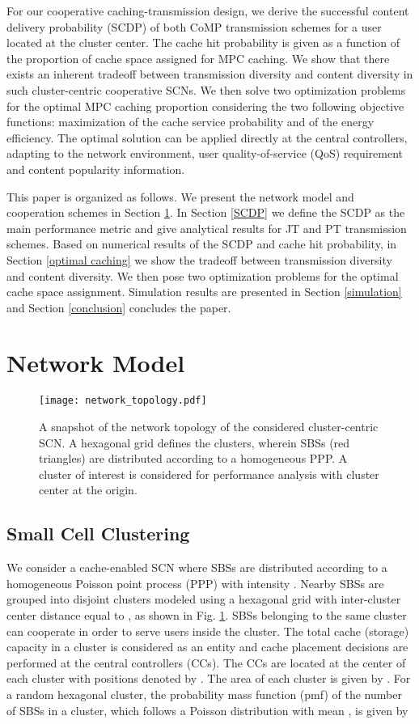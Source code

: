 \documentclass[twocolumns,10pt]{IEEEtran}
\begin{document}
For our cooperative caching-transmission design, we derive the successful content delivery probability (SCDP) of both CoMP transmission schemes for a user located at the cluster center. The cache hit probability is given as a function of the proportion of cache space assigned for MPC caching. We show that there exists an inherent tradeoff between transmission diversity and content diversity in such cluster-centric cooperative SCNs. We then solve two optimization problems for the optimal MPC caching proportion considering the two following objective functions: maximization of the cache service probability and of the energy efficiency. The optimal solution can be applied directly at the central controllers, adapting to the network environment, user quality-of-service (QoS) requirement and content popularity information. 

This paper is organized as follows. We present the network model and cooperation schemes in Section \ref{section_2}. In Section \ref{SCDP} we define the SCDP as the main performance metric and give analytical results for JT and PT transmission schemes. Based on numerical results of the SCDP and cache hit probability, in Section \ref{optimal caching} we show the tradeoff between transmission diversity and content diversity. We then pose two optimization problems for the optimal cache space assignment. Simulation results are presented in Section \ref{simulation} and Section \ref{conclusion} concludes the paper. 


\section{Network Model}
\label{section_2}

\begin{figure}
	\centering
	\texttt{[image: network\_topology.pdf]}
	\caption{ A snapshot of the network topology of the considered cluster-centric SCN. A hexagonal grid defines the clusters, wherein SBSs (red triangles) are distributed according to a homogeneous PPP. A cluster of interest is considered for performance analysis with cluster center at the origin.}
	\label{network}
\end{figure}

\subsection{Small Cell Clustering}
We consider a cache-enabled SCN where SBSs are distributed according to a homogeneous Poisson point process (PPP)  with intensity . Nearby SBSs are grouped into disjoint clusters modeled using a hexagonal grid with inter-cluster center distance equal to  \cite{hexagonal}, as shown in Fig. \ref{network}. SBSs belonging to the same cluster can cooperate in order to serve users inside the cluster. The total cache (storage) capacity in a cluster is considered as an entity and cache placement decisions are performed at the central controllers (CCs). The CCs are located at the center of each cluster with positions denoted by . The area of each cluster is given by . 
For a random hexagonal cluster, the probability mass function (pmf) of the number  of SBSs in a cluster, which follows a Poisson distribution with mean , is given by 
\end{document}
